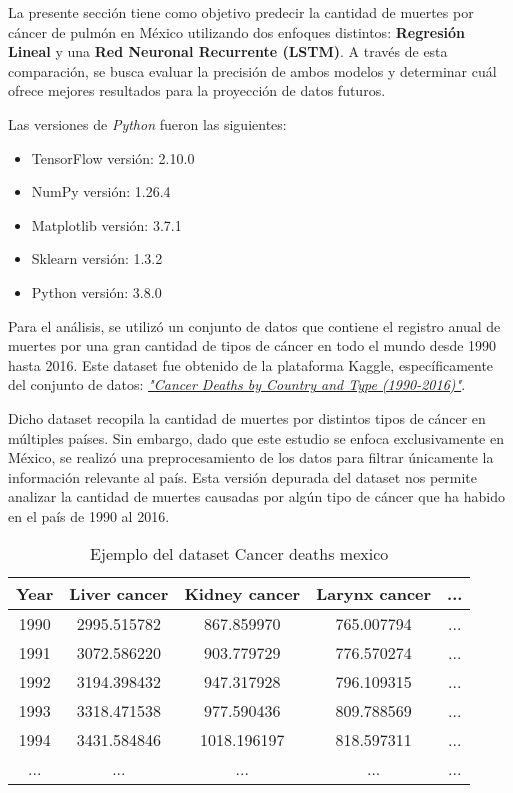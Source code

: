La presente sección tiene como objetivo predecir la cantidad de muertes por cáncer de pulmón en México utilizando dos enfoques distintos: \textbf{Regresión Lineal} y una \textbf{Red Neuronal Recurrente (LSTM)}. A través de esta comparación, se busca evaluar la precisión de ambos modelos y determinar cuál ofrece mejores resultados para la proyección de datos futuros.

Las versiones de \textit{Python} fueron las siguientes:

\begin{itemize}
    \item TensorFlow versión: 2.10.0
    \item NumPy versión: 1.26.4
    \item Matplotlib versión: 3.7.1
    \item Sklearn versión: 1.3.2
    \item Python versión: 3.8.0
\end{itemize}

Para el análisis, se utilizó un conjunto de datos que contiene el registro anual de muertes por una gran cantidad de tipos de cáncer en todo el mundo desde 1990 hasta 2016. Este dataset fue obtenido de la plataforma Kaggle, específicamente del conjunto de datos:
\href{https://www.kaggle.com/datasets/antimoni/cancer-deaths-by-country-and-type-1990-2016}{\textit{"Cancer Deaths by Country and Type (1990-2016)"}}.


Dicho dataset recopila la cantidad de muertes por distintos tipos de cáncer en múltiples países. Sin embargo, dado que este estudio se enfoca exclusivamente en México, se realizó una preprocesamiento de los datos para filtrar únicamente la información relevante al país. Esta versión depurada del dataset nos permite analizar la cantidad de muertes causadas por algún tipo de cáncer que ha habido en el país de 1990 al 2016. 


\begin{table}[ht]
    \centering
    \begin{tabular}{|c|c|c|c|c|}
    \hline
    \textbf{Year} & \textbf{Liver cancer} & \textbf{Kidney cancer} & \textbf{Larynx cancer} & \textbf{...}\\ \hline
    1990 & 2995.515782 & 867.859970 & 765.007794 & ...\\ \hline
    1991 & 3072.586220 & 903.779729 & 776.570274 & ...\\ \hline
    1992 & 3194.398432 & 947.317928 & 796.109315 & ...\\ \hline
    1993 & 3318.471538 & 977.590436 & 809.788569 & ...\\ \hline
    1994 & 3431.584846 & 1018.196197 & 818.597311 & ...\\ \hline
    ... & ... & ... & ... & ...\\ \hline
    \end{tabular}
    \caption{Ejemplo del dataset Cancer deaths mexico}
    \label{table:cancer_cases}
\end{table}



